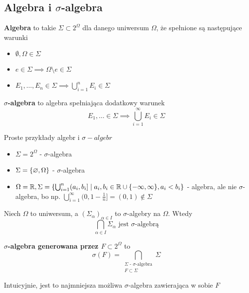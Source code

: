 \subsection{Algebra i \texorpdfstring{\(\sigma\)}{sigma}-algebra}

\begin{definition}
	\textbf{Algebra} to takie \(\Sigma \subset 2^{\Omega}\) dla danego uniwersum \(\Omega\), że spełnione są następujące warunki
	\begin{itemize}
		\item \(\emptyset, \Omega \in \Sigma\)
		\item \(e \in \Sigma \implies \Omega \setminus e \in \Sigma\)
		\item \(E_1, \dots, E_n \in \Sigma \implies \bigcup_{i=1}^n E_i \in \Sigma\)
	\end{itemize}
\end{definition}

\begin{definition}
	\textbf{\(\sigma\)-algebra} to algebra spełniająca dodatkowy warunek
	\[
		E_1, \dots \in \Sigma \implies \bigcup_{i=1}^{\infty} E_i \in \Sigma
	\]
\end{definition}

\begin{example}
	Proste przykłady algebr i \(\sigma-algebr\)
	\begin{itemize}
		\item \(\Sigma = 2^{\Omega}\) - \(\sigma\)-algebra
		\item \(\Sigma = \set{\emptyset, \Omega}\) - \(\sigma\)-algebra
		\item \(\Omega = \real, \Sigma = \set{\bigcup_{i=1}^n (a_i, b_i] \mid a_i, b_i \in \real \cup \set{-\infty, \infty}, a_i < b_i}\) - algebra, ale nie \(\sigma\)-algebra, bo np. \(\bigcup_{i=1}^\infty (0, 1 - \frac{1}{n}] = (0, 1) \notin \Sigma\)
	\end{itemize}
\end{example}

\begin{lemma}
	Niech \(\Omega\) to uniwersum, a \((\Sigma_\alpha)_{\alpha \in I}\) to \(\sigma\)-algebry na \(\Omega\). Wtedy
	\[
		\bigcap_{\alpha \in I} \Sigma_\alpha \text{ jest \(\sigma\)-algebrą}
	\]
\end{lemma}

\begin{definition}
	\textbf{\(\sigma\)-algebra generowana przez \(F \subset 2^\Omega\)} to
	\[
		\sigma(F) = \bigcap_{\substack{\Sigma \text{ - } \sigma\text{-algebra}\\F \subset \Sigma}} \Sigma
	\]
	
	Intuicyjnie, jest to najmniejsza możliwa \(\sigma\)-algebra zawierająca w sobie \(F\)
\end{definition}

